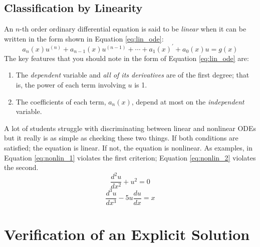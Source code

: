 \subsection{Classification by Linearity}
An $n$-th order ordinary differential equation is said to be \emph{linear} when it can be written in the form shown in Equation \ref{eq:lin_ode}:
\begin{equation}
a_n(x)u^{(n)}+a_{n-1}(x)u^{(n-1)}+\cdots+a_1(x)^{\prime}+a_0(x)u = g(x)
\label{eq:lin_ode}
\end{equation}
The key features that you should note in the form of Equation \ref{eq:lin_ode} are:
\begin{enumerate}
\item The \emph{dependent} variable and \emph{all of its derivatives} are of the first degree; that is, the power of each term involving $u$ is 1.
\item The coefficients of each term, $a_n(x)$, depend at most on the \emph{independent} variable.
\end{enumerate}
A lot of students struggle with discriminating between linear and nonlinear ODEs but it really is as simple as checking these two things.  If both conditions are satisfied; the equation is linear.  If not, the equation is nonlinear.  As examples, in Equation \ref{eq:nonlin_1} violates the first criterion; Equation \ref{eq:nonlin_2} violates the second.
\begin{equation}
\frac{d^2u}{dx^2}+u^2 = 0 
\label{eq:nonlin_1}
\end{equation}
\begin{equation}
\frac{d^3u}{dx^3}-5u\frac{du}{dx}=x
\label{eq:nonlin_2}
\end{equation}
\section{Verification of an Explicit Solution} 


